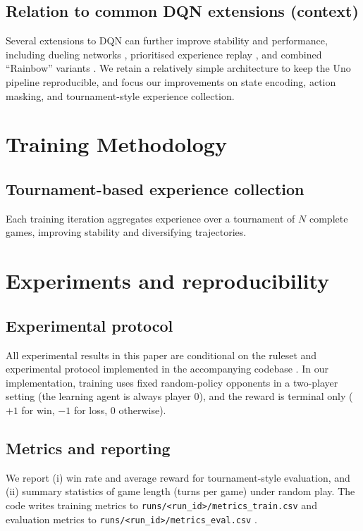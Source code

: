 \documentclass[11pt]{article}
\begin{document}
\subsection{Relation to common DQN extensions (context)}
Several extensions to DQN can further improve stability and performance, including dueling networks \parencite{wang2016dueling}, prioritised experience replay \parencite{schaul2016prioritized}, and combined ``Rainbow'' variants \parencite{hessel2018rainbow}. We retain a relatively simple architecture to keep the Uno pipeline reproducible, and focus our improvements on state encoding, action masking, and tournament-style experience collection.

\section{Training Methodology}
\subsection{Tournament-based experience collection}
Each training iteration aggregates experience over a tournament of $N$ complete games, improving stability and diversifying trajectories.

\section{Experiments and reproducibility}
\subsection{Experimental protocol}
All experimental results in this paper are conditional on the ruleset and experimental protocol implemented in the accompanying codebase \parencite{policyuno_repo}. In our implementation, training uses fixed random-policy opponents in a two-player setting (the learning agent is always player 0), and the reward is terminal only ($+1$ for win, $-1$ for loss, $0$ otherwise).

\subsection{Metrics and reporting}
We report (i) win rate and average reward for tournament-style evaluation, and (ii) summary statistics of game length (turns per game) under random play. The code writes training metrics to \texttt{runs/<run\_id>/metrics\_train.csv} and evaluation metrics to \texttt{runs/<run\_id>/metrics\_eval.csv} \parencite{policyuno_repo}.
\end{document}
